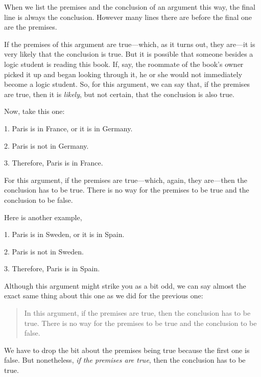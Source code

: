 \begin{notebox}
When we list the premises and the conclusion of an argument this way, the final line is always the conclusion. However many lines there are before the final one are the premises.
\end{notebox}

\noindent If the premises of this argument are true---which, as it turns out, they are---it is very likely that the conclusion is true. But it is possible that someone besides a logic student is reading this book. If, say, the roommate of the book's owner picked it up and began looking through it, he or she would not immediately become a logic student. So, for this argument, we can say that, if the premises are true, then it is \textit{likely}, but not certain, that the conclusion is also true. 

Now, take this one:
	\begin{earg}\label{valid-bananas}
		\item[1.] Paris is in France, or it is in Germany.
		\item[2.] Paris is not in Germany.
		\item[3.] Therefore, Paris is in France.
	\end{earg}
For this argument, if the premises are true---which, again, they are---then the conclusion has to be true. There is no way for the premises to be true and the conclusion to be false. 

Here is another example,
\smallskip

\noindent\begin{minipage}{0.99\textwidth}
	\begin{earg}
		\item[1.] Paris is in Sweden, or it is in Spain.
		\item[2.] Paris is not in Sweden. 
		\item[3.] Therefore, Paris is in Spain.
	\end{earg}
\smallskip
\end{minipage}

\noindent Although this argument might strike you as a bit odd, we can say almost the exact same thing about this one as we did for the previous one:
\begin{quote}
In this argument, if the premises are true, then the conclusion has to be true. There is no way for the premises to be true and the conclusion to be false. 
\end{quote}
We have to drop the bit about the premises being true because the first one is false. But nonetheless, \textit{if the premises are true}, then the conclusion has to be true. 

